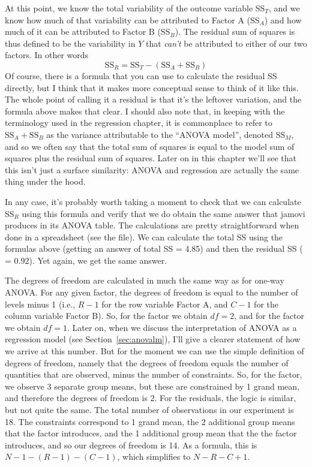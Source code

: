 \begin{mdframed}[style=MyFrame,nobreak=false]
At this point, we know the total variability of the outcome variable SS$_T$, and we know how much of that variability can be attributed to Factor A (SS$_A$) and how much of it can be attributed to Factor B (SS$_B$). The residual sum of squares is thus defined to be the variability in $Y$ that {\it can't} be attributed to either of our two factors. In other words
$$
\mbox{SS}_R = \mbox{SS}_T - (\mbox{SS}_A + \mbox{SS}_B)
$$
Of course, there is a formula that you can use to calculate the residual SS directly, but I think that it makes more conceptual sense to think of it like this. The whole point of calling it a residual is that it's the leftover variation, and the formula above makes that clear. I should also note that, in keeping with the terminology used in the regression chapter, it is commonplace to refer to $\mbox{SS}_A + \mbox{SS}_B$ as the variance attributable to the ``ANOVA model'', denoted SS$_M$, and so we often say that the total sum of squares is equal to the model sum of squares plus the residual sum of squares. Later on in this chapter we'll see that this isn't just a surface similarity: ANOVA and regression are actually the same thing under the hood. 

In any case, it's probably worth taking a moment to check that we can calculate SS$_R$ using this formula and verify that we do obtain the same answer that jamovi produces in its ANOVA table. The calculations are pretty straightforward when done in a spreadsheet (see the  file). We can calculate the total SS using the formulas above (getting an answer of total SS = 4.85) and then the residual SS ( = 0.92). Yet again, we get the same answer. 

\end{mdframed}


The degrees of freedom are calculated in much the same way as for one-way ANOVA. For any given factor, the degrees of freedom is equal to the number of levels minus 1 (i.e., $R-1$ for the row variable Factor A, and $C-1$ for the column variable Factor B). So, for the  factor we obtain $df = 2$, and for the  factor we obtain $df=1$. Later on, when we discuss the interpretation of ANOVA as a regression model (see Section~\ref{sec:anovalm}), I'll give a clearer statement of how we arrive at this number. But for the moment we can use the simple definition of degrees of freedom, namely that the degrees of freedom equals the number of quantities that are observed, minus the number of constraints. So, for the  factor, we observe 3 separate group means, but these are constrained by 1 grand mean, and therefore the degrees of freedom is 2. For the residuals, the logic is similar, but not quite the same. The total number of observations in our experiment is 18. The constraints correspond to 1 grand mean, the 2 additional group means that the  factor introduces, and the 1 additional group mean that the the  factor introduces, and so our degrees of freedom is 14. As a formula, this is $N-1 -(R-1)-(C-1)$, which simplifies to $N-R-C+1$.

